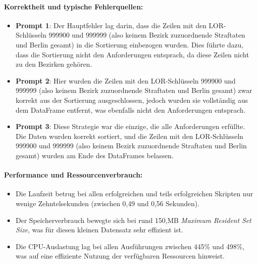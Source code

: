 \documentclass[11pt,a4paper]{article}
\begin{document}
\paragraph{Korrektheit und typische Fehlerquellen:}
\begin{itemize}
    \item \textbf{Prompt 1}: Der Hauptfehler lag darin, dass die Zeilen mit den LOR-Schlüsseln 999900 und 999999 (also keinem Bezirk zuzuordnende Straftaten und Berlin gesamt) in die Sortierung einbezogen wurden. Dies führte dazu, dass die Sortierung nicht den Anforderungen entsprach, da diese Zeilen nicht zu den Bezirken gehören.
    \item \textbf{Prompt 2}: Hier wurden die Zeilen mit den LOR-Schlüsseln 999900 und 999999 (also keinem Bezirk zuzuordnende Straftaten und Berlin gesamt) zwar korrekt aus der Sortierung ausgeschlossen, jedoch wurden sie vollständig aus dem DataFrame entfernt, was ebenfalls nicht den Anforderungen entsprach.
    \item \textbf{Prompt 3}: Diese Strategie war die einzige, die alle Anforderungen erfüllte. Die Daten wurden korrekt sortiert, und die Zeilen mit den LOR-Schlüsseln 999900 und 999999 (also keinem Bezirk zuzuordnende Straftaten und Berlin gesamt) wurden am Ende des DataFrames belassen.
\end{itemize}
    
\paragraph{Performance und Ressourcenverbrauch:}
\begin{itemize}
    \item Die Laufzeit betrug bei allen erfolgreichen und teils erfolgreichen Skripten nur wenige Zehntelsekunden (zwischen 0,49 und 0,56 Sekunden).
    \item Der Speicherverbrauch bewegte sich bei rund 150,MB \emph{Maximum Resident Set Size}, was für diesen kleinen Datensatz sehr effizient ist.
    \item Die CPU-Auslastung lag bei allen Ausführungen zwischen 445\% und 498\%, was auf eine effiziente Nutzung der verfügbaren Ressourcen hinweist.
\end{itemize}
    
\end{document}
